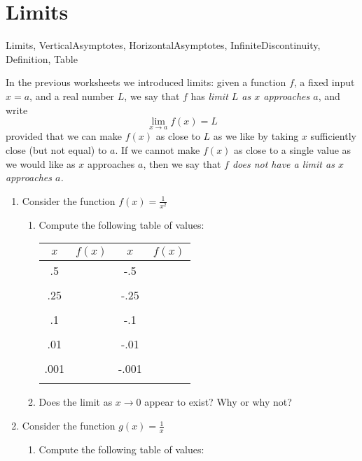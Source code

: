 
\section{Limits}


\begin{tagblock}{Limits, VerticalAsymptotes, HorizontalAsymptotes, InfiniteDiscontinuity, Definition, Table}
\begin{question}
	In the previous worksheets we introduced limits: given a function $f$, a fixed input $x=a$, and a real number $L$, we say that $f$ has  \emph{limit $L$ as $x$ approaches $a$}, and write 
\[\lim_{x \to a}f(x) = L\]
provided that we can make $f(x)$ as close to $L$ as we like by taking $x$ sufficiently close (but not equal) to $a$. If we cannot make $f(x)$ as close to a single value as we would like as $x$ approaches $a$, then we say that \emph{$f$ does not have a limit as $x$ approaches $a$.}

\begin{enumerate}
\item Consider the function $\displaystyle f(x) = \frac{1}{x^2}$
\begin{enumerate}
\item Compute the following table of values:


\begin{tabular}{c | c c | c  }
$x$ & $f(x)$  \hspace{2in} & $x$ & $f(x)$ \\ \hline
.5 & \hspace{.5in} & -.5 &  \\ &&& \\
.25 & & -.25  & \\ &&&\\
.1 & & -.1& \\&&& \\
.01 && -.01 &\\ &&&\\
.001 && -.001 &\\ &&&\\
\end{tabular}
\item Does the limit as $x \to 0$ appear to exist?  Why or why not?
\end{enumerate}

\vspace{1in} 

\item Consider the function $\displaystyle g(x) = \frac{1}{x}$
\begin{enumerate}
\item Compute the following table of values:



\end{enumerate}
\end{enumerate}
\end{question}
\end{tagblock}
